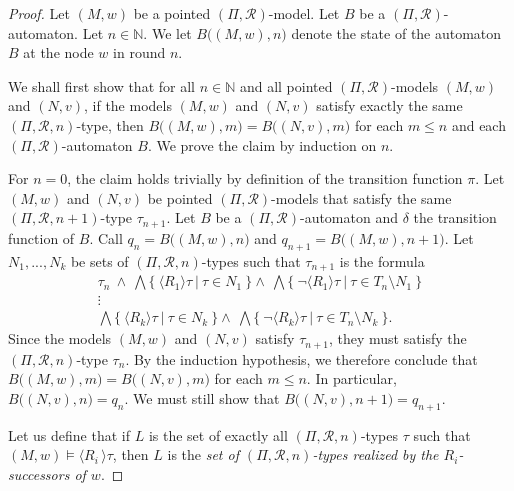 \documentclass[copyright,creativecommons]{eptcs}
\begin{document}
\begin{proof}
Let $(M,w)$ be a pointed $(\Pi,\mathcal{R})$-model.
Let $B$ be a $(\Pi,\mathcal{R})$-automaton.
Let $n\in\mathbb{N}$. We let $B\bigl((M,w),n\bigr)$
denote the state of the automaton $B$ at the node $w$ in round $n$.




We shall first show that for all $n\in\mathbb{N}$ and all pointed $(\Pi,\mathcal{R})$-models $(M,w)$ and $(N,v)$,
if the models $(M,w)$ and $(N,v)$ satisfy exactly the same $(\Pi,\mathcal{R},n)$-type,
then $B\bigl((M,w),m\bigr) = B\bigl((N,v),m\bigr)$ 
for each $m\leq n$ and each $(\Pi,\mathcal{R})$-automaton $B$.
We prove the claim by induction on $n$.




For $n=0$, the claim holds
trivially by definition of the
transition function $\pi$.
Let $(M,w)$ and $(N,v)$ be pointed $(\Pi,\mathcal{R})$-models that satisfy the same
$(\Pi,\mathcal{R},n+1)$-type $\tau_{n+1}$.
Let $B$ be a $(\Pi,\mathcal{R})$-automaton and $\delta$ the transition function of $B$.
Call $q_n = B\bigl((M,w),n\bigr)$ and $q_{n+1} = B\bigl((M,w),n+1\bigr)$.
Let $N_1,...,N_k$ be sets of $(\Pi,\mathcal{R},n)$-types such that $\tau_{n+1}$ is the formula
\begin{multline*}
\tau_n\ \wedge\ \bigwedge\{\ \langle R_1\rangle \tau\ |\
\tau\in N_1\ \}
\wedge\ \bigwedge\{\ \neg\langle R_1\rangle \tau\ |\ \tau\in T_n\setminus N_1\ \}\\
\vdots\\
\bigwedge\{\ \langle R_k\rangle \tau\ |\
\tau\in N_k\ \}
\wedge\ \bigwedge\{\ \neg\langle R_k\rangle \tau\ |\ \tau\in T_n\setminus N_k\ \}.
\end{multline*}
Since the models $(M,w)$ and $(N,v)$ satisfy $\tau_{n+1}$, they must
satisfy the $(\Pi,\mathcal{R},n)$-type $\tau_n$. 
By the induction hypothesis, we therefore conclude that $B\bigl((M,w),m\bigr) = B\bigl((N,v),m\bigr)$
for each $m\leq n$. In particular, $B\bigl((N,v),n\bigr) = q_n$.
We must still show that $B\bigl((N,v),n+1\bigr) = q_{n+1}$.




Let us define that if $L$ is the set of exactly all $(\Pi,\mathcal{R},n)$-types $\tau$ such that
$(M,w)\models \langle R_i\, \rangle\tau$, then $L$ is the
\emph{set of $(\Pi,\mathcal{R},n)$-types realized by the $R_i$-successors of $w$}.





\end{proof}
\end{document}
